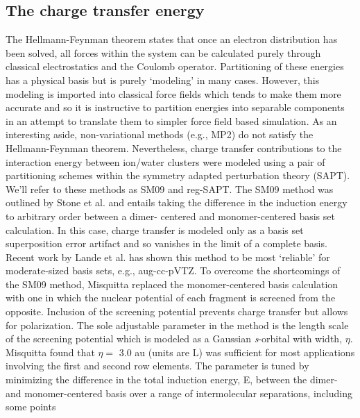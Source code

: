 \begin{sie}
   \subsection{\label{sec3:sec1:level4}The charge transfer energy}
    The Hellmann-Feynman theorem states that once an electron distribution has been solved, all forces within the system can be calculated
    purely through classical electrostatics and the Coulomb operator. Partitioning of these energies has a physical basis but is purely
    `modeling' in many cases\cite{politzer2015mathematical}. However, this modeling is imported into classical force fields which tends to 
    make them more accurate and so it is instructive to partition energies into separable components in an attempt to translate them to simpler
    force field based simulation. As an interesting aside, non-variational methods (e.g., MP2) do not satisfy the Hellmann-Feynman theorem\cite{jensen2013introduction}.
    Nevertheless, charge transfer contributions to the interaction energy between ion/water clusters were modeled using a pair of partitioning schemes
    within the symmetry adapted perturbation theory (SAPT)\cite{jeziorski1994sapt}. We'll refer to these methods as SM09 and reg-SAPT. The
    SM09 method was outlined by Stone et al. and entails taking the difference in the induction energy to arbitrary order between a dimer-
    centered and monomer-centered basis set calculation\cite{stone2009ct}. In this case, charge transfer is modeled only as a basis set 
    superposition error artifact and so vanishes in the limit of a complete basis. Recent work by Lande et al. has shown this method to be 
    most `reliable' for moderate-sized basis sets, e.g., aug-cc-pVTZ\cite{lande2015cdftct}. To overcome the shortcomings of the SM09 method,
    Misquitta replaced the monomer-centered basis calculation with one in which the nuclear potential of each fragment is screened from the
    opposite\cite{misquitta2013regsapt}. Inclusion of the screening potential prevents charge transfer but allows for polarization. The sole 
    adjustable parameter in the method is the length scale of the screening potential which is modeled as a Gaussian \emph{s}-orbital with
    width, $\eta$. Misquitta found that $\eta =$ 3.0 au (units are L) was sufficient for most applications involving the first and 
    second row elements\cite{misquitta2013regsapt}. The parameter is tuned by minimizing the difference in the total induction energy,
    E, between the dimer- and monomer-centered basis over a range of intermolecular separations, including some points

\end{sie}
